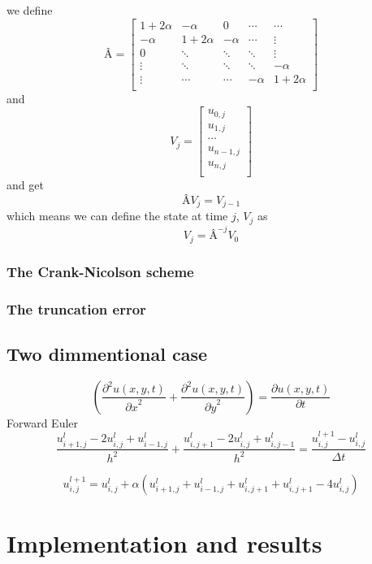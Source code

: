 \documentclass[10pt,a4paper]{article}
\newcommand{\dt}{{\Delta t}}
\newcommand{\pt}{{\partial t}}
\newcommand{\px}{{\partial x}}
\newcommand{\py}{{\partial y}}
\newcommand{\pu}{{\partial u}}
\newcommand{\ppu}{{\partial^2 u}}
\begin{document}
we define
\[
Â = \begin{bmatrix}
1+2\alpha & -\alpha & 0 & \cdots & \cdots \\
-\alpha & 1+2\alpha & -\alpha & \cdots & \vdots \\
0 & \ddots & \ddots & \ddots & \vdots \\
\vdots & \ddots & \ddots & \ddots & -\alpha \\
\vdots & \cdots & \cdots & -\alpha & 1+2\alpha \\
\end{bmatrix}
\]
and
\[ V_j = \begin{bmatrix}
u_{0,j}\\
u_{1,j}\\
\cdots\\
u_{n-1,j}\\
u_{n,j}\\
\end{bmatrix}
\]
and get
\begin{equation}
ÂV_j = V_{j-1}
\end{equation}
which means we can define the state at time $j$, $V_j$ as
\begin{equation}
V_j = Â^{-j}V_0
\end{equation}


\subsubsection{The Crank-Nicolson scheme}


\subsubsection{The truncation error}


\subsection{Two dimmentional case}
\begin{equation}
\left(\frac{\ppu(x,y,t)}{\px^2} + \frac{\ppu(x,y,t)}{\py^2}\right) = \frac{\pu(x,y,t)}{\pt}
\end{equation}
Forward Euler
\begin{equation}
\frac{u_{i+1,j}^l - 2u_{i,j}^l + u_{i-1,j}^l}{h^2} + \frac{u_{i,j+1}^l - 2u_{i,j}^l + u_{i,j-1}^l}{h^2} = \frac{u_{i,j}^{l+1} - u_{i,j}^l}{\dt}
\end{equation}

\begin{equation}
u_{i,j}^{l+1} = u_{i,j}^l + \alpha\left( u_{i+1,j}^l + u_{i-1,j}^l + u_{i,j+1}^l + u_{i,j+1}^l - 4u_{i,j}^l \right)
\end{equation}



\section{Implementation and results}\label{sec:implementation_and_results}




{}
\end{document}
